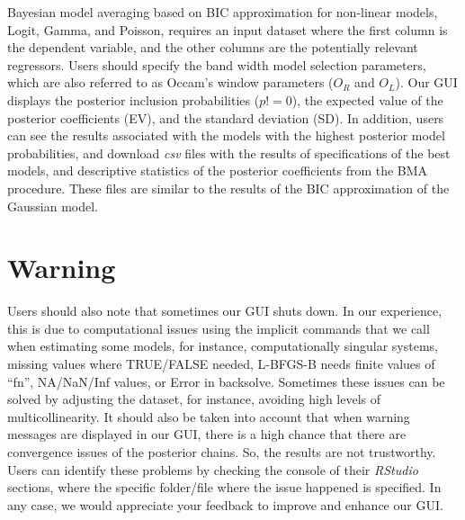 Bayesian model averaging based on BIC approximation for non-linear models, Logit, Gamma, and Poisson, requires an input dataset where the first column is the dependent variable, and the other columns are the potentially relevant regressors. Users should specify the band width model selection parameters, which are also referred to as Occam's window parameters ($O_R$ and $O_L$). Our GUI displays the posterior inclusion probabilities ($p!=0$), the expected value of the posterior coefficients (EV), and the standard deviation (SD). In addition, users can see the results associated with the models with the highest posterior model probabilities, and download \textit{csv} files with the results of specifications of the best models, and descriptive statistics of the posterior coefficients from the BMA procedure. These files are similar to the results of the BIC approximation of the Gaussian model.

\section{Warning}\label{secGUI7}

Users should also note that sometimes our GUI shuts down. In our experience, this is due to computational issues using the implicit commands that we call when estimating some models, for instance, computationally singular systems, missing values where TRUE/FALSE needed, L-BFGS-B needs finite values of ``fn'', NA/NaN/Inf values, or Error in backsolve. Sometimes these issues can be solved by adjusting the dataset, for instance, avoiding high levels of multicollinearity. It should also be taken into account that when warning messages are displayed in our GUI, there is a high chance that there are convergence issues of the posterior chains. So, the results are not trustworthy. Users can identify these problems by checking the console of their \textit{RStudio} sections, where the specific folder/file where the issue happened is specified. In any case, we would appreciate your feedback to improve and enhance our GUI.
